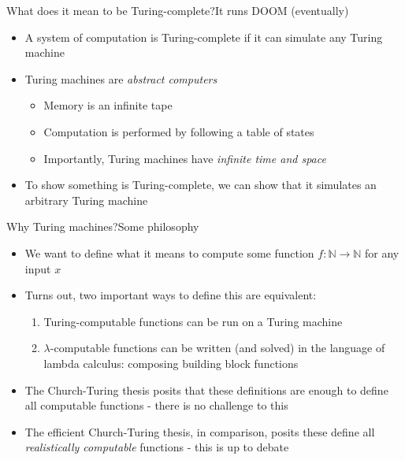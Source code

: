 \documentclass[aspectratio=169]{beamer}
\begin{document}
\begin{frame}{What does it mean to be Turing-complete?}{It runs DOOM (eventually)}
    \begin{itemize}
        \item A system of computation is Turing-complete if it can simulate any Turing machine \pause
        \item Turing machines are \textit{abstract computers} \pause
        \begin{itemize}
            \item Memory is an infinite tape \pause
            \item Computation is performed by following a table of states \pause
            \item Importantly, Turing machines have \textit{infinite time and space} \pause
        \end{itemize}
        \item To show something is Turing-complete, we can show that it simulates an arbitrary Turing machine
    \end{itemize}
\end{frame}

\begin{frame}{Why Turing machines?}{Some philosophy}
    \begin{itemize}
        \item We want to define what it means to compute some function $f: \mathbb{N} \rightarrow \mathbb{N}$ for any input $x$ \pause
        \item Turns out, two important ways to define this are equivalent: \pause
        \begin{enumerate}
            \item Turing-computable functions can be run on a Turing machine \pause
            \item $\lambda$-computable functions can be written (and solved) in the language of lambda calculus: composing building block functions \pause
        \end{enumerate}
        \item The \textcolor{sigma@mainblue}{Church-Turing thesis}\cite{sep-church-turing} posits that these definitions are enough to define all computable functions - there is no challenge to this \pause
        \item The efficient Church-Turing thesis, in comparison, posits these define all \textit{realistically computable} functions - this is up to debate
    \end{itemize}
\end{frame}
\end{document}
